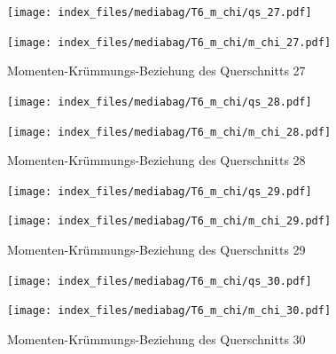 \documentclass[
  11pt,
  letterpaper,
]{scrreprt}
\begin{document}
\begin{figure}[H]

\begin{minipage}{0.50\linewidth}
\texttt{[image: index\_files/mediabag/T6\_m\_chi/qs\_27.pdf]}\end{minipage}%
%
\begin{minipage}{0.50\linewidth}
\texttt{[image: index\_files/mediabag/T6\_m\_chi/m\_chi\_27.pdf]}\end{minipage}%

\caption{\label{fig-m_chi_appendix}Momenten-Krümmungs-Beziehung des
Querschnitts 27}

\end{figure}%

\begin{figure}[H]

\begin{minipage}{0.50\linewidth}
\texttt{[image: index\_files/mediabag/T6\_m\_chi/qs\_28.pdf]}\end{minipage}%
%
\begin{minipage}{0.50\linewidth}
\texttt{[image: index\_files/mediabag/T6\_m\_chi/m\_chi\_28.pdf]}\end{minipage}%

\caption{\label{fig-m_chi_appendix}Momenten-Krümmungs-Beziehung des
Querschnitts 28}

\end{figure}%

\begin{figure}[H]

\begin{minipage}{0.50\linewidth}
\texttt{[image: index\_files/mediabag/T6\_m\_chi/qs\_29.pdf]}\end{minipage}%
%
\begin{minipage}{0.50\linewidth}
\texttt{[image: index\_files/mediabag/T6\_m\_chi/m\_chi\_29.pdf]}\end{minipage}%

\caption{\label{fig-m_chi_appendix}Momenten-Krümmungs-Beziehung des
Querschnitts 29}

\end{figure}%

\begin{figure}[H]

\begin{minipage}{0.50\linewidth}
\texttt{[image: index\_files/mediabag/T6\_m\_chi/qs\_30.pdf]}\end{minipage}%
%
\begin{minipage}{0.50\linewidth}
\texttt{[image: index\_files/mediabag/T6\_m\_chi/m\_chi\_30.pdf]}\end{minipage}%

\caption{\label{fig-m_chi_appendix}Momenten-Krümmungs-Beziehung des
Querschnitts 30}

\end{figure}%
\end{document}
